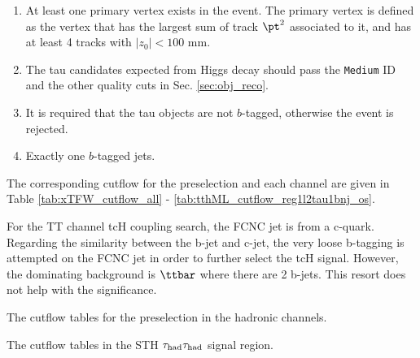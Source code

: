 \begin{enumerate}
\item At least one primary vertex exists in the event. The primary vertex is defined as the vertex that has the largest sum of track $\pt^2$ associated to it, and has at least 4 tracks with $|z_0|<100$ mm.
\item The tau candidates expected from Higgs decay should pass the \texttt{Medium} ID and the other quality cuts in Sec. \ref{sec:obj_reco}.
\item It is required that the tau objects are not $b$-tagged, otherwise the event is rejected.
\item Exactly one $b$-tagged jets. 
\end{enumerate}



The corresponding cutflow for the preselection and each channel are given in Table \ref{tab:xTFW_cutflow_all} - \ref{tab:tthML_cutflow_reg1l2tau1bnj_os}.

For the TT channel tcH coupling search, the FCNC jet is from a c-quark. Regarding the similarity between the b-jet and c-jet, the very loose b-tagging is attempted on the FCNC jet in order to further select the tcH signal. However, the dominating background is $\ttbar$ where there are 2 b-jets. This resort does not help with the significance.

\begin{table}
\caption{The cutflow tables for the preselection in the hadronic channels.}
\label{tab:xTFW_cutflow_all}
\footnotesize

\end{table}

\begin{table}
\caption{The cutflow tables in the STH $\tau_\text{had}{}\tau_\text{had}$ signal region.}

\end{table}

